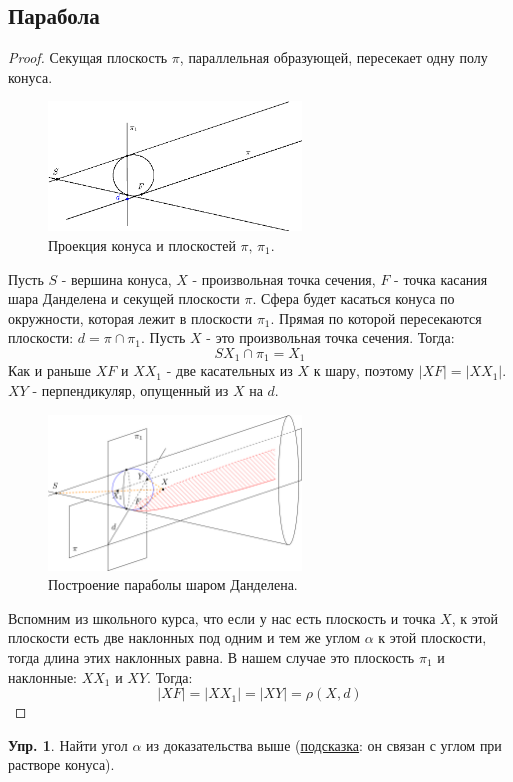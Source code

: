 \documentclass[12pt]{article}
\theoremstyle{definition}
\newtheorem{exrc}{Упр.}
\begin{document}
\subsection*{Парабола}
\begin{proof}
	Секущая плоскость $\pi$, параллельная образующей, пересекает одну полу конуса.
	\begin{figure}[H]
		\centering
		\includegraphics[width=0.6\textwidth]{ANGL1_14.eps}
		\caption{Проекция конуса и плоскостей $\pi, \, \pi_1$.}
		\label{1_14}
	\end{figure}
	Пусть $S$ - вершина конуса, $X$ - произвольная точка сечения, $F$ - точка касания шара Данделена и секущей плоскости $\pi$. Сфера будет касаться конуса по окружности, которая лежит в плоскости $\pi_1$. Прямая по которой пересекаются плоскости: $d = \pi \cap \pi_1$. Пусть $X$ - это произвольная точка сечения. Тогда:
	$$
		SX_1 \cap \pi_1 = X_1
	$$
	Как и раньше $XF$ и $XX_1$ - две касательных из $X$ к шару, поэтому $|XF| = |XX_1|$. $XY$ - перпендикуляр, опущенный из $X$ на $d$.
	\begin{figure}[H]
		\centering
		\includegraphics[width=0.6\textwidth]{ANGL1_15.png}
		\caption{Построение параболы шаром Данделена.}
		\label{1_15}
	\end{figure}
	Вспомним из школьного курса, что если у нас есть плоскость и точка $X$, к этой плоскости есть две наклонных под одним и тем же углом $\alpha$ к этой плоскости, тогда длина этих наклонных равна. В нашем случае это плоскость $\pi_1$ и наклонные: $XX_1$ и $XY$. Тогда:
	$$
		|XF| = |XX_1| = |XY| = \rho(X,d)
	$$
\end{proof}
\begin{exrc}
	Найти угол $\alpha$ из доказательства выше (\uline{подсказка}: он связан с углом при растворе конуса).
\end{exrc}
\end{document}

